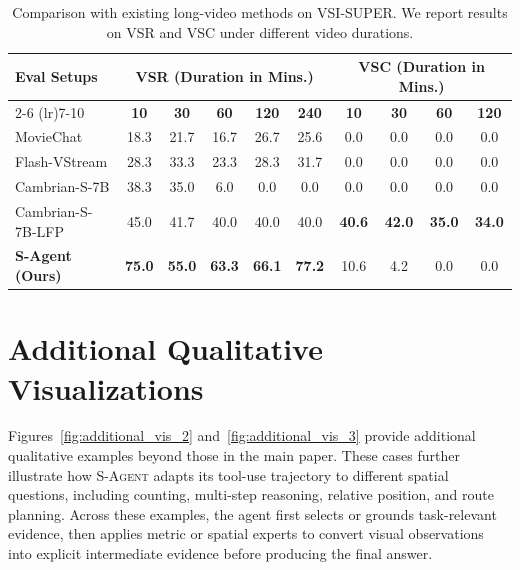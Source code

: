 \documentclass{llmxive}
\begin{document}
\begin{table}[t]
    \centering
    \small
    \setlength{\tabcolsep}{8pt}
    \begin{tabular}{l|ccccc|cccc}
        \toprule
        \multirow{2}{*}{\textbf{Eval Setups}} 
        & \multicolumn{5}{c|}{\textbf{VSR (Duration in Mins.)}} 
        & \multicolumn{4}{c}{\textbf{VSC (Duration in Mins.)}} \\
        \cmidrule(lr){2-6} \cmidrule(lr){7-10}
        & \textbf{10} & \textbf{30} & \textbf{60} & \textbf{120} & \textbf{240}
        & \textbf{10} & \textbf{30} & \textbf{60} & \textbf{120} \\
        \midrule
        MovieChat      & 18.3 & 21.7 & 16.7 & 26.7 & 25.6 & 0.0  & 0.0  & 0.0  & 0.0  \\
        Flash-VStream  & 28.3 & 33.3 & 23.3 & 28.3 & 31.7 & 0.0  & 0.0  & 0.0  & 0.0  \\
        Cambrian-S-7B  & 38.3 & 35.0 & 6.0 & 0.0 & 0.0 & 0.0  & 0.0  & 0.0  & 0.0 \\
        Cambrian-S-7B-LFP  & 45.0 & 41.7 & 40.0 & 40.0 & 40.0 & \textbf{40.6} & \textbf{42.0} & \textbf{35.0} & \textbf{34.0} \\
        \midrule
        \textbf{S-Agent (Ours)}  & \textbf{75.0} & \textbf{55.0} & \textbf{63.3} & \textbf{66.1} & \textbf{77.2} & 10.6 & 4.2 & 0.0 & 0.0 \\
        \bottomrule
    \end{tabular}
\caption{Comparison with existing long-video methods on VSI-SUPER. We report results on VSR and VSC under different video durations.}
\label{tab:vsi_super}
\end{table}

\section{Additional Qualitative Visualizations}
\label{app:additional_qualitative}

Figures~\ref{fig:additional_vis_2} and~\ref{fig:additional_vis_3} provide additional qualitative examples beyond those in the main paper. These cases further illustrate how \textsc{S-Agent} adapts its tool-use trajectory to different spatial questions, including counting, multi-step reasoning, relative position, and route planning. Across these examples, the agent first selects or grounds task-relevant evidence, then applies metric or spatial experts to convert visual observations into explicit intermediate evidence before producing the final answer.
\end{document}
